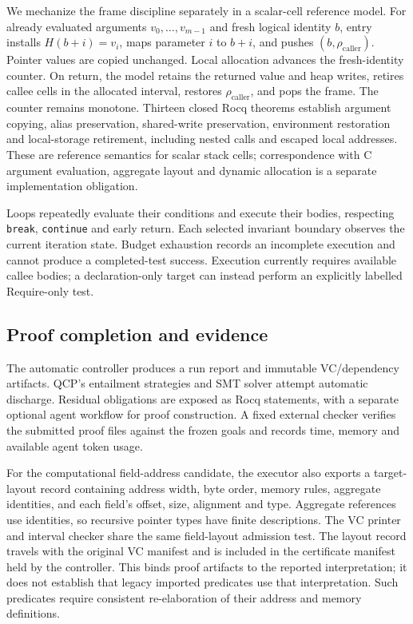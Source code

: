 We mechanize the frame discipline separately in a scalar-cell reference model.
For already evaluated arguments $v_0,\ldots,v_{m-1}$ and fresh logical identity
$b$, entry installs $H(b+i)=v_i$, maps parameter $i$ to $b+i$, and pushes
$(b,\rho_{\mathrm{caller}})$. Pointer values are copied unchanged. Local
allocation advances the fresh-identity counter. On return, the model retains
the returned value and heap writes, retires callee cells in the allocated
interval, restores $\rho_{\mathrm{caller}}$, and pops the frame. The counter
remains monotone. Thirteen closed Rocq theorems establish argument copying,
alias preservation, shared-write preservation, environment restoration and
local-storage retirement, including nested calls and escaped local addresses.
These are reference semantics for scalar stack cells; correspondence with C
argument evaluation, aggregate layout and dynamic allocation is a separate
implementation obligation.

Loops repeatedly evaluate their conditions and execute their bodies, respecting
\texttt{break}, \texttt{continue} and early return. Each selected invariant
boundary observes the current iteration state. Budget exhaustion records an
incomplete execution and cannot produce a completed-test success. Execution
currently requires available callee bodies; a declaration-only target can
instead perform an explicitly labelled Require-only test.

\subsection{Proof completion and evidence}

The automatic controller produces a run report and immutable VC/dependency
artifacts. QCP's entailment strategies and SMT solver attempt automatic
discharge. Residual obligations are exposed as Rocq statements, with a
separate optional agent workflow for proof construction. A fixed external
checker verifies the submitted proof files against the frozen goals and records
time, memory and available agent token usage.

For the computational field-address candidate, the executor also exports a
target-layout record containing address width, byte order, memory rules,
aggregate identities, and each field's offset, size, alignment and type.
Aggregate references use identities, so recursive pointer types have finite
descriptions. The VC printer and interval checker share the same field-layout
admission test. The layout record travels with the original VC manifest and
is included in the certificate manifest held by the controller. This binds
proof artifacts to the reported interpretation; it does not establish that
legacy imported predicates use that interpretation. Such predicates require
consistent re-elaboration of their address and memory definitions.

